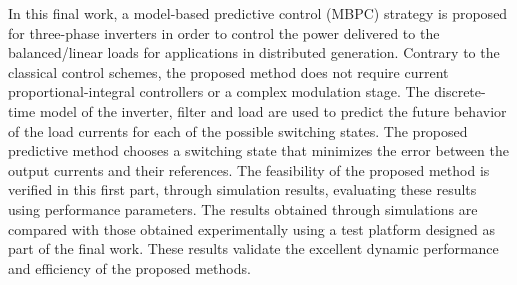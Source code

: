 In this final work, a model-based predictive control (MBPC) strategy is proposed for three-phase inverters in order to control the power delivered to the balanced/linear loads  for applications in distributed generation. Contrary to the classical control schemes, the proposed method does not require current proportional-integral controllers or a complex modulation stage. The discrete-time model of the inverter, filter and load are used to predict the future behavior of the load currents for each of the possible switching states. The proposed predictive method chooses a switching state that minimizes the error between the output currents and their references. The feasibility of the proposed method is verified in this first part, through simulation results, evaluating these results using performance parameters. The results obtained through simulations are compared with those obtained experimentally using a test platform designed as part of the final work. These results validate the excellent dynamic performance and efficiency of the proposed methods.